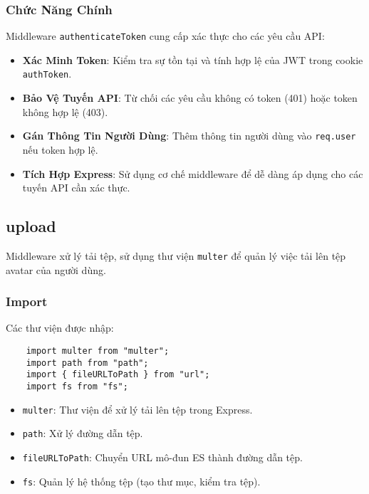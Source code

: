             \subsubsection{Chức Năng Chính}
                \hspace*{0.6cm}Middleware \texttt{authenticateToken} cung cấp xác thực cho các yêu cầu API:
                \begin{itemize}
                    \item \textbf{Xác Minh Token}: Kiểm tra sự tồn tại và tính hợp lệ của JWT trong cookie \texttt{authToken}.
                    \item \textbf{Bảo Vệ Tuyến API}: Từ chối các yêu cầu không có token (401) hoặc token không hợp lệ (403).
                    \item \textbf{Gán Thông Tin Người Dùng}: Thêm thông tin người dùng vào \texttt{req.user} nếu token hợp lệ.
                    \item \textbf{Tích Hợp Express}: Sử dụng cơ chế middleware để dễ dàng áp dụng cho các tuyến API cần xác thực.
                \end{itemize}
        \subsection{upload}
            \hspace*{0.6cm}Middleware xử lý tải tệp, sử dụng thư viện \texttt{multer} để quản lý việc tải lên tệp avatar của người dùng.
            \subsubsection{Import}
                \hspace*{0.6cm}Các thư viện được nhập:
                \begin{lstlisting}
    import multer from "multer";
    import path from "path";
    import { fileURLToPath } from "url";
    import fs from "fs";
                \end{lstlisting}
                \begin{itemize}
                    \item \texttt{multer}: Thư viện để xử lý tải lên tệp trong Express.
                    \item \texttt{path}: Xử lý đường dẫn tệp.
                    \item \texttt{fileURLToPath}: Chuyển URL mô-đun ES thành đường dẫn tệp.
                    \item \texttt{fs}: Quản lý hệ thống tệp (tạo thư mục, kiểm tra tệp).
                \end{itemize}

